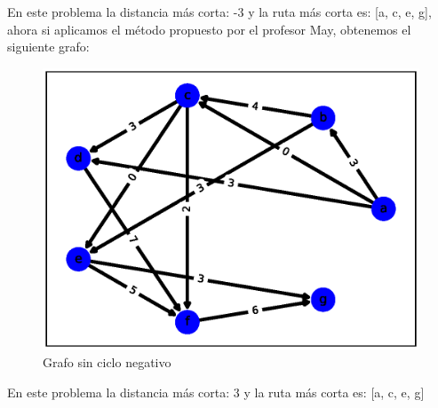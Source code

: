 \documentclass{report}
\begin{document}
\begin{enumerate}
  En este problema la distancia más corta: -3 y la ruta más corta es:  [a, c, e, g], ahora si aplicamos el método propuesto por el profesor May, obtenemos el siguiente grafo:
  \begin{figure}[h!t]
    \centering
    \includegraphics[scale = 0.4]{ejemplo10.eps}
    \caption{Grafo sin ciclo negativo}
    \label{sinciclonegativo2}
  \end{figure}

  En este problema la distancia más corta: 3 y la ruta más corta es:  [a, c, e, g]


\end{enumerate}
\end{document}
